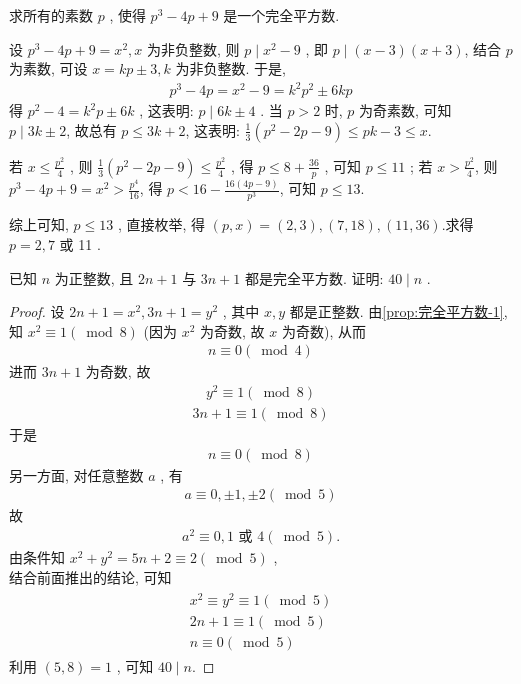 \begin{example}
	求所有的素数 $p$ , 使得 $p^{3}-4 p+9$ 是一个完全平方数.
\end{example}
\begin{solution}
	设 $p^{3}-4 p+9=x^{2}, x$ 为非负整数, 则 $p \mid x^{2}-9$ , 即 $p \mid(x-3)(x+3)$, 结合 $p$ 为素数, 可设 $x=k p \pm 3, k$ 为非负整数. 于是,
	\begin{align*}
		p^{3}-4 p=x^{2}-9=k^{2} p^{2} \pm 6 k p
	\end{align*}
	得 $p^{2}-4=k^{2} p \pm 6 k$ , 这表明:  $p \mid 6 k \pm 4$ .
	当 $p>2$ 时, $p$ 为奇素数, 可知 $p \mid 3 k \pm 2$, 故总有 $p \leqslant 3 k+2$, 这表明: $\frac{1}{3}\left(p^{2}-2 p-9\right) \leqslant p k-3 \leqslant x$.

	若 $x \leqslant \frac{p^{2}}{4}$ , 则 $\frac{1}{3}\left(p^{2}-2 p-9\right) \leqslant \frac{p^{2}}{4}$ , 得 $p \leqslant 8+\frac{36}{p}$ , 可知 $p \leqslant 11$ ;
	若 $x>\frac{p^{2}}{4}$, 则 $p^{3}-4 p+9=x^{2}>\frac{p^{4}}{16}$, 得 $p<16-\frac{16(4 p-9)}{p^{3}}$, 可知 $p \leqslant 13$.

	综上可知, $p \leqslant 13$ , 直接枚举, 得 $(p, x)=(2,3),(7,18),(11,36)$.求得 $p=2,7$ 或 11 .
\end{solution}
\begin{example}
	已知 $n$ 为正整数, 且 $2 n+1$ 与 $3 n+1$ 都是完全平方数. 证明:  $40 \mid n$ .
\end{example}
\begin{proof}
	设 $2 n+1=x^{2}, 3 n+1=y^{2}$ , 其中 $x ,  y$ 都是正整数.
	由\autoref{prop:完全平方数-1}, 知 $x^{2} \equiv 1(\bmod 8)$ (因为 $x^{2}$ 为奇数, 故 $x$ 为奇数), 从而
	\begin{align*}
		n \equiv 0(\bmod 4)
	\end{align*}
	进而 $3 n+1$ 为奇数, 故
	\begin{align*}
		y^{2} \equiv 1(\bmod 8)
	\end{align*}
	\begin{align*}
		3 n+1 \equiv 1(\bmod 8)
	\end{align*}
	于是
	\begin{align*}
		n \equiv 0(\bmod 8)
	\end{align*}
	另一方面, 对任意整数 $a$ , 有
	\begin{align*}
		a \equiv 0, \pm 1, \pm 2(\bmod 5)
	\end{align*}
	故
	\begin{align*}
		a^{2} \equiv 0,1 \text { 或 } 4(\bmod 5) .
	\end{align*}
	由条件知 $x^{2}+y^{2}=5 n+2 \equiv 2(\bmod 5)$ , \\
	结合前面推出的结论, 可知
	\begin{align*}
		\begin{gathered}
			x^{2} \equiv y^{2} \equiv 1(\bmod 5) \\
			2 n+1 \equiv 1(\bmod 5) \\
			n \equiv 0(\bmod 5)
		\end{gathered}
	\end{align*}
	利用 $(5,8)=1$ , 可知 $40 \mid n$.
\end{proof}

